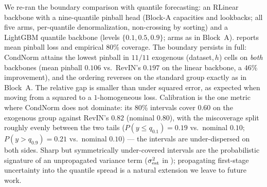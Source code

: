 We re-ran the boundary comparison with quantile forecasting: an RLinear
backbone with a nine-quantile pinball head (Block-A capacities and
lookbacks; all five arms, per-quantile denormalization, non-crossing by
sorting) and a LightGBM quantile backbone (levels $\{0.1,0.5,0.9\}$; arms
as in Block~A).  reports mean pinball loss and empirical
80\% coverage. The boundary persists in full: CondNorm attains the lowest
pinball in $11/11$ exogenous (dataset,\,$h$) cells on \emph{both}
backbones (mean pinball $0.106$ vs.\ RevIN's $0.197$ on the linear
backbone, a $46\%$ improvement), and the ordering reverses on the standard
group exactly as in Block~A. The relative gap is smaller than under
squared error, as expected when moving from a squared to a
$1$-homogeneous loss. Calibration is the one metric where CondNorm does
not dominate: its 80\% intervals cover $0.60$ on the exogenous group
against RevIN's $0.82$ (nominal $0.80$), with the miscoverage split
roughly evenly between the two tails ($P(y \le q_{0.1}) = 0.19$ vs.\
nominal $0.10$; $P(y > q_{0.9}) = 0.21$ vs.\ nominal $0.10$) --- the
intervals are under-dispersed on both sides. Sharp but symmetrically
under-covered intervals are the probabilistic signature of an unpropagated
variance term ($\sigma_{\mathrm{est}}^2$ in \Cref{sec:theory}); propagating first-stage
uncertainty into the quantile spread is a natural extension we leave to
future work.

